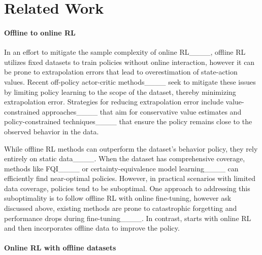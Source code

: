 \section{Related Work}
\label{sec:related}

\paragraph{Offline to online RL}%








In an effort to mitigate the sample complexity of online RL____,
offline RL utilizes fixed datasets to train policies without online interaction, however it can be prone to extrapolation errors that lead to overestimation of state-action values.
Recent off-policy actor-critic methods____ seek to mitigate these issues by limiting policy learning to the scope of the dataset, thereby minimizing extrapolation error. 
Strategies for reducing extrapolation error include value-constrained approaches____ that aim for conservative value estimates and policy-constrained techniques____ that ensure the policy remains close to the observed behavior in the data.

While offline RL methods can outperform the dataset’s behavior policy, they rely entirely on static data____. When the dataset has comprehensive coverage, methods like FQI____ or certainty-equivalence model learning____ can efficiently find near-optimal policies. %
However, in practical scenarios with limited data coverage, policies tend to be suboptimal. 
One approach to addressing this suboptimality is to follow offline RL with online fine-tuning, however ask discussed above, existing methods are prone to catastrophic forgetting and performance drops during fine-tuning____. In contrast, \algname starts with online RL and then incorporates offline data to improve the policy.


\paragraph{Online RL with offline datasets}
\vspace{-0.3cm}



